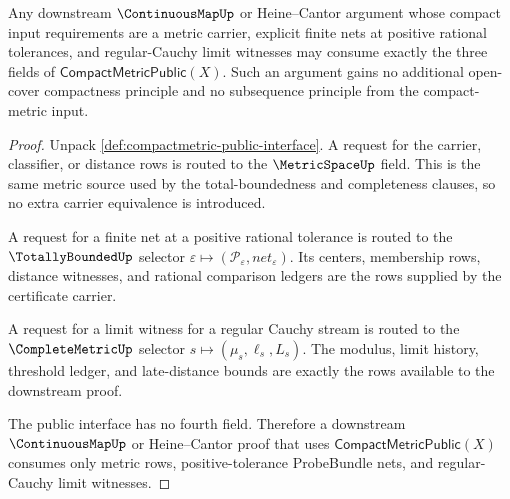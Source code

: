 \begin{theorem}
\label{thm:compactmetric-downstream-consumption-bridge}
Any downstream $\ContinuousMapUp$ or Heine--Cantor argument whose compact input
requirements are a metric carrier, explicit finite nets at positive rational
tolerances, and regular-Cauchy limit witnesses may consume exactly the three
fields of $\mathsf{CompactMetricPublic}(X)$. Such an argument gains no
additional open-cover compactness principle and no subsequence principle from
the compact-metric input.
\end{theorem}
\begin{proof}
Unpack \autoref{def:compactmetric-public-interface}. A request for the carrier,
classifier, or distance rows is routed to the $\MetricSpaceUp$ field. This is
the same metric source used by the total-boundedness and completeness clauses,
so no extra carrier equivalence is introduced.

A request for a finite net at a positive rational tolerance is routed to the
$\TotallyBoundedUp$ selector
$\varepsilon \mapsto (\mathcal{P}_{\varepsilon},net_{\varepsilon})$. Its
centers, membership rows, distance witnesses, and rational comparison ledgers
are the rows supplied by the certificate carrier.

A request for a limit witness for a regular Cauchy stream is routed to the
$\CompleteMetricUp$ selector $s \mapsto (\mu_s,\ell_s,L_s)$. The modulus,
limit history, threshold ledger, and late-distance bounds are exactly the rows
available to the downstream proof.

The public interface has no fourth field. Therefore a downstream
$\ContinuousMapUp$ or Heine--Cantor proof that uses
$\mathsf{CompactMetricPublic}(X)$ consumes only metric rows, positive-tolerance
ProbeBundle nets, and regular-Cauchy limit witnesses.
\end{proof}

